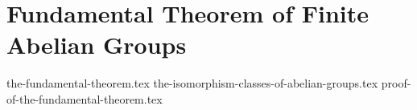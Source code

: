 \chapter{Fundamental Theorem of Finite Abelian Groups}
{the-fundamental-theorem.tex}
{the-isomorphism-classes-of-abelian-groups.tex}
{proof-of-the-fundamental-theorem.tex}
